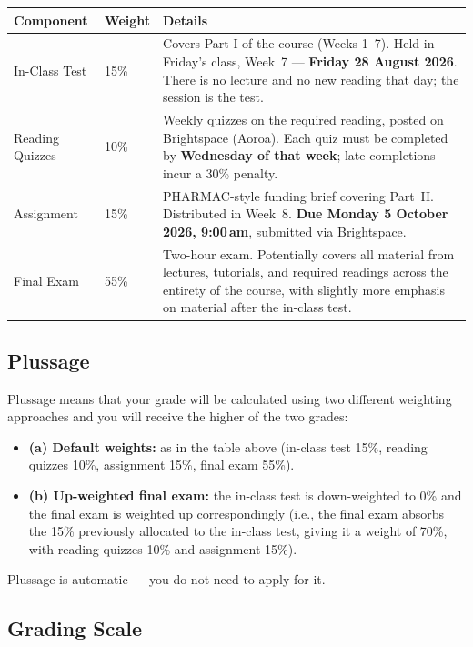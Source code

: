 \documentclass[11pt, a4paper]{article}
\begin{document}
\begin{center}
\begin{tabular}{L{3.2cm} C{1.5cm} L{9cm}}
\toprule
\textbf{Component} & \textbf{Weight} & \textbf{Details} \\
\midrule
In-Class Test & 15\% & Covers Part I of the course (Weeks 1--7). Held in Friday's class, Week~7 — \textbf{Friday 28 August 2026}. There is no lecture and no new reading that day; the session is the test. \\
\addlinespace
Reading Quizzes & 10\% & Weekly quizzes on the required reading, posted on Brightspace (Aoroa). Each quiz must be completed by \textbf{Wednesday of that week}; late completions incur a 30\% penalty. \\
\addlinespace
Assignment & 15\% & PHARMAC-style funding brief covering Part~II. Distributed in Week~8. \textbf{Due Monday 5 October 2026, 9:00\,am}, submitted via Brightspace. \\
\addlinespace
Final Exam & 55\% & Two-hour exam. Potentially covers all material from lectures, tutorials, and required readings across the entirety of the course, with slightly more emphasis on material after the in-class test. \\
\bottomrule
\end{tabular}
\end{center}

\subsection{Plussage}

Plussage means that your grade will be calculated using two different weighting approaches and you will receive the higher of the two grades:
\begin{itemize}
  \item \textbf{(a) Default weights:} as in the table above (in-class test 15\%, reading quizzes 10\%, assignment 15\%, final exam 55\%).
  \item \textbf{(b) Up-weighted final exam:} the in-class test is down-weighted to 0\% and the final exam is weighted up correspondingly (i.e., the final exam absorbs the 15\% previously allocated to the in-class test, giving it a weight of 70\%, with reading quizzes 10\% and assignment 15\%).
\end{itemize}

Plussage is automatic — you do not need to apply for it.

\subsection{Grading Scale}
\end{document}
